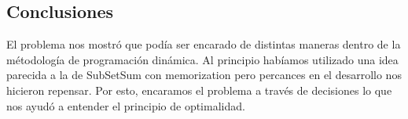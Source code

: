 \subsection{Conclusiones}
El problema nos mostró que podía ser encarado de distintas maneras dentro de la métodología de programación dinámica. Al principio habíamos utilizado una idea parecida a la de SubSetSum con memorization pero percances en el desarrollo nos hicieron repensar. Por esto, encaramos el problema a través de decisiones lo que nos ayudó a entender el principio de optimalidad.
